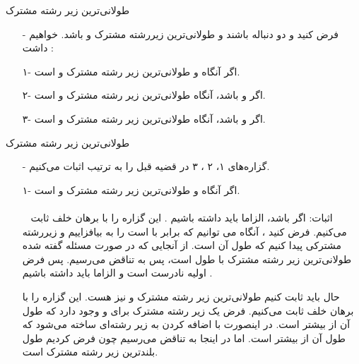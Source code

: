 \begin{frame}{‌طولانی‌ترین زیر رشته مشترک}
\begin{itemize}\itemr
\item[-]
فرض کنید
و
دو دنباله باشند و
طولانی‌ترین زیررشته مشترک
و
باشد. خواهیم داشت :
\item[۱-]
اگر
آنگاه
و
طولانی‌ترین زیر رشته مشترک
و
است.
\item[۲-]
اگر
و
باشد، آنگاه
طولانی‌ترین زیر رشته مشترک
و
است.
\item[۳-]
اگر
و
باشد، آنگاه
طولانی‌ترین زیر رشته مشترک
و
است.
\end{itemize}
\end{frame}


\begin{frame}{‌طولانی‌ترین زیر رشته مشترک}
\begin{itemize}\itemr
\item[-]
گزاره‌های ۱، ۲ ، ۳ در قضیه قبل را به ترتیب اثبات می‌کنیم.
\item[۱-]
اگر
آنگاه
و
طولانی‌ترین زیر رشته مشترک
و
است.
\\~
\\~
اثبات: اگر
باشد، الزاما باید داشته باشیم
.
این گزاره را با برهان خلف ثابت می‌کنیم. فرض کنید
، آنگاه می توانیم
که برابر با
است را به
بیافزاییم و زیررشته مشترکی پیدا کنیم که طول آن
است. از آنجایی که در صورت مسئله گفته شده
طولانی‌ترین زیر رشته مشترک با طول
است، پس به تناقض می‌رسیم. پس فرض اولیه نادرست است و الزاما باید داشته باشیم
.

حال باید ثابت کنیم
طولانی‌ترین زیر رشته مشترک
و
نیز هست. این گزاره را با برهان خلف ثابت می‌کنیم. فرض یک زیر رشته مشترک
برای
و
وجود دارد که طول آن از
بیشتر است. در اینصورت با اضافه کردن
به
زیر رشته‌ای ساخته می‌شود که طول آن از
بیشتر است. اما در اینجا به تناقض می‌رسیم چون فرض کردیم طول بلندترین زیر رشته مشترک
است.
\end{itemize}
\end{frame}


